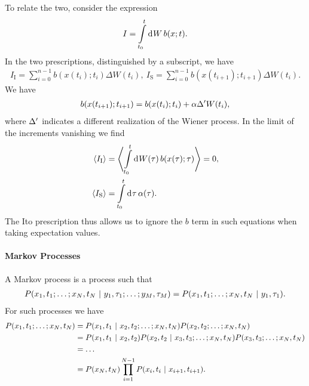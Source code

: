 To relate the two, consider the expression
\begin{align*}
	I = \int\limits_{t_{0}}^{t}\dd[]{W}b(x; t).
\end{align*}
In the two prescriptions, distinguished by a subscript, we have
\begin{align*}
	I_{\text{I}} = \sum\limits_{i = 0}^{n - 1}b(x(t_{i}); t_{i})\Delta W(t_{i}),\ I_{\text{S}} = \sum\limits_{i = 0}^{n - 1}b(x(t_{i + 1}); t_{i + 1})\Delta W(t_{i}).
\end{align*}
We have
\begin{align*}
	b(x(t_{i + 1}); t_{i + 1}) = b(x(t_{i}); t_{i}) + \alpha\Delta^{\prime} W(t_{i}),
\end{align*}
where $\Delta^{\prime}$ indicates a different realization of the Wiener process. In the limit of the increments vanishing we find
\begin{align*}
	\expval{I_{\text{I}}} &= \expval{\int\limits_{t_{0}}^{t}\dd[]{W(\tau)}b(x(\tau); \tau)} = 0, \\
	\expval{I_{\text{S}}} &= \int\limits_{t_{0}}^{t}\dd[]{\tau}\alpha(\tau).
\end{align*}
The Ito prescription thus allows us to ignore the $b$ term in such equations when taking expectation values.

\paragraph{Markov Processes}
A Markov process is a process such that
\begin{align*}
	P(x_{1}, t_{1}; \dots; x_{N}, t_{N} \ | \  y_{1}, \tau_{1}; \dots; y_{M}, \tau_{M}) = P(x_{1}, t_{1}; \dots; x_{N}, t_{N} \ | \  y_{1}, \tau_{1}).
\end{align*}
For such processes we have
\begin{align*}
	P(x_{1}, t_{1}; \dots; x_{N}, t_{N}) &= P(x_{1}, t_{1} \ | \  x_{2}, t_{2}; \dots; x_{N}, t_{N})P(x_{2}, t_{2}; \dots; x_{N}, t_{N}) \\
	                                     &= P(x_{1}, t_{1} \ | \  x_{2}, t_{2})P(x_{2}, t_{2} \ | \  x_{3}, t_{3}; \dots; x_{N}, t_{N})P(x_{3}, t_{3}; \dots; x_{N}, t_{N}) \\
	                                     &= \dots \\
	                                     &= P(x_{N}, t_{N})\prod\limits_{i = 1}^{N - 1}P(x_{i}, t_{i} \ | \  x_{i + 1}, t_{i + 1}).
\end{align*}

